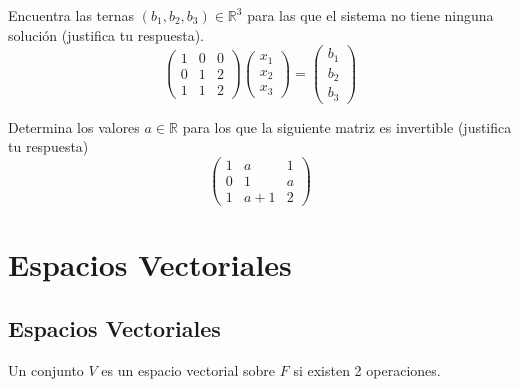 \documentclass[12pt,a4paper]{book}
\begin{document}
    \begin{ejercicio}
        Encuentra las ternas $(b_{1},b_{2},b_{3})\in\mathbb{R}^{3}$ para las que
        el sistema no tiene ninguna solución (justifica tu respuesta).
        \begin{equation*}
            \begin{pmatrix}
                1 & 0 & 0\\
                0 & 1 & 2\\
                1 & 1 & 2
            \end{pmatrix}
            \begin{pmatrix}
                x_{1}\\
                x_{2}\\
                x_{3}
            \end{pmatrix}
            =
            \begin{pmatrix}
                b_{1}\\
                b_{2}\\
                b_{3}
            \end{pmatrix}
        \end{equation*}
    \end{ejercicio}

    \begin{ejercicio}
        Determina los valores $a\in\mathbb{R}$ para los que la siguiente
        matriz es invertible (justifica tu respuesta)
        \begin{equation*}
            \begin{pmatrix}
                1 & a & 1\\
                0 & 1 & a\\
                1 & a+1 & 2
            \end{pmatrix}
        \end{equation*}
    \end{ejercicio}

    \ncinterludio
    \chapter{Espacios Vectoriales}

    \section{Espacios Vectoriales}

    Un conjunto $V$ es un espacio vectorial sobre $F$ si existen 2 operaciones.
\end{document}
